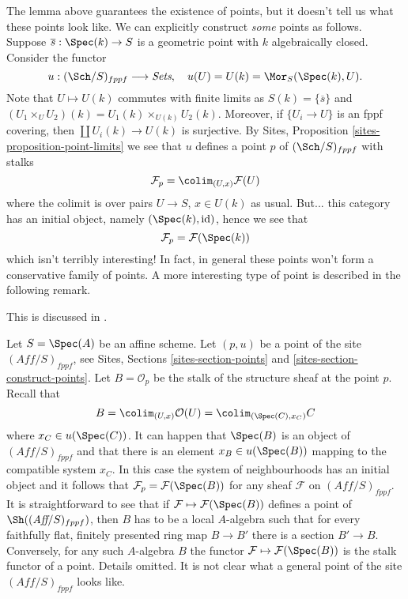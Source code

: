 \noindent
The lemma above guarantees the existence of points, but it doesn't
tell us what these points look like. We can explicitly construct
{\it some} points as follows.
Suppose $\overline{s} : \Spec(k) \to S$ is a geometric
point with $k$ algebraically closed. Consider the functor
$$
u : (\Sch/S)_{fppf} \longrightarrow \textit{Sets},
\quad
u(U) = U(k) = \Mor_S(\Spec(k), U).
$$
Note that $U \mapsto U(k)$ commutes with finite limits as
$S(k) = \{\overline{s}\}$ and
$(U_1 \times_U U_2)(k) = U_1(k) \times_{U(k)} U_2(k)$.
Moreover, if $\{U_i \to U\}$ is an fppf covering, then
$\coprod U_i(k) \to U(k)$ is surjective.
By
Sites, Proposition \ref{sites-proposition-point-limits}
we see that $u$ defines a point $p$ of $(\Sch/S)_{fppf}$ with
stalks
$$
\mathcal{F}_p = \colim_{(U, x)} \mathcal{F}(U)
$$
where the colimit is over pairs $U \to S$, $x \in U(k)$ as usual.
But... this category has an initial object, namely
$(\Spec(k), \text{id})$, hence we see that
$$
\mathcal{F}_p = \mathcal{F}(\Spec(k))
$$
which isn't terribly interesting! In fact, in general these points won't
form a conservative family of points. A more interesting type of point
is described in the following remark.

\begin{remark}
\label{remark-points-fppf-site}
\begin{reference}
This is discussed in \cite{Schroeer}.
\end{reference}
Let $S = \Spec(A)$ be an affine scheme. Let $(p, u)$ be a point of
the site $(\textit{Aff}/S)_{fppf}$, see
Sites, Sections \ref{sites-section-points} and
\ref{sites-section-construct-points}. Let $B = \mathcal{O}_p$ be the stalk
of the structure sheaf at the point $p$. Recall that
$$
B = \colim_{(U, x)} \mathcal{O}(U) =
\colim_{(\Spec(C), x_C)} C
$$
where $x_C \in u(\Spec(C))$. It can happen that
$\Spec(B)$ is an object of $(\textit{Aff}/S)_{fppf}$
and that there is an element $x_B \in u(\Spec(B))$ mapping to
the compatible system $x_C$. In this case the system of neighbourhoods
has an initial object and it follows that
$\mathcal{F}_p = \mathcal{F}(\Spec(B))$ for any sheaf $\mathcal{F}$
on $(\textit{Aff}/S)_{fppf}$. It is straightforward
to see that if $\mathcal{F} \mapsto \mathcal{F}(\Spec(B))$ defines a point
of $\Sh((\textit{Aff}/S)_{fppf})$, then
$B$ has to be a local $A$-algebra such that for every faithfully flat,
finitely presented ring map $B \to B'$ there is a section $B' \to B$.
Conversely, for any such $A$-algebra $B$ the functor
$\mathcal{F} \mapsto \mathcal{F}(\Spec(B))$ is the stalk functor
of a point. Details omitted. It is not clear what a general point of the
site $(\textit{Aff}/S)_{fppf}$ looks like.
\end{remark}











